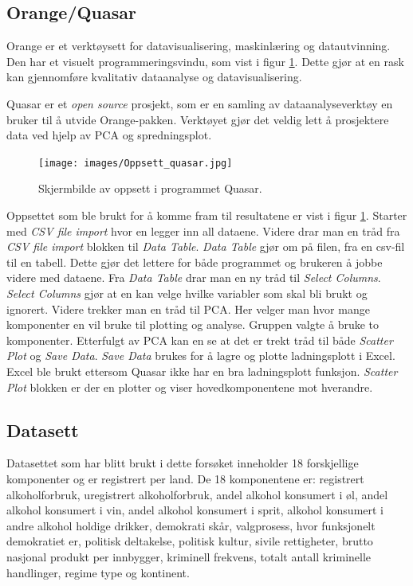 \documentclass[twocolumn, 11pt]{article} %
\begin{document}
\subsection{Orange/Quasar}
Orange er et verktøysett for datavisualisering, maskinlæring og datautvinning. Den har et visuelt programmeringsvindu, som vist i figur \ref{Oppsett_quasar}. Dette gjør at en rask kan gjennomføre kvalitativ dataanalyse og datavisualisering.\cite{Orange}

Quasar er et \textit{open source} prosjekt, som er en samling av dataanalyseverktøy en bruker til å utvide Orange-pakken\cite{Quasar}. Verktøyet gjør det veldig lett å prosjektere data ved hjelp av PCA og spredningsplot. 

\begin{figure}[ht]
\texttt{[image: images/Oppsett\_quasar.jpg]}
\caption{Skjermbilde av oppsett i programmet Quasar.}
\label{Oppsett_quasar}
\end{figure}

Oppsettet som ble brukt for å komme fram til resultatene er vist i figur \ref{Oppsett_quasar}. 
Starter med \textit{CSV file import} hvor en legger inn all dataene. Videre drar man en tråd fra \textit{CSV file import} blokken til \textit{Data Table}. \textit{Data Table} gjør om på filen, fra en csv-fil til en tabell. Dette gjør det lettere for både programmet og brukeren å jobbe videre med dataene. Fra \textit{Data Table} drar man en ny tråd til \textit{Select Columns}. \textit{Select Columns} gjør at en kan velge hvilke variabler som skal bli brukt og ignorert. Videre trekker man en tråd til PCA. Her velger man hvor mange komponenter en vil bruke til plotting og analyse. Gruppen valgte å bruke to komponenter. Etterfulgt av PCA kan en se at det er trekt tråd til både \textit{Scatter Plot} og \textit{Save Data}. \textit{Save Data} brukes for å lagre og plotte ladningsplott i Excel. Excel ble brukt ettersom Quasar ikke har en bra ladningsplott funksjon. \textit{Scatter Plot} blokken er der en plotter og viser hovedkomponentene mot hverandre. 

\subsection{Datasett}
Datasettet som har blitt brukt i dette forsøket inneholder 18 forskjellige komponenter og er registrert per land. De 18 komponentene er: registrert alkoholforbruk, uregistrert alkoholforbruk, andel alkohol konsumert i øl, andel alkohol konsumert i vin, andel alkohol konsumert i sprit, alkohol konsumert i andre alkohol holdige drikker, demokrati skår, valgprosess, hvor funksjonelt demokratiet er, politisk deltakelse, politisk kultur, sivile rettigheter, brutto nasjonal produkt per innbygger, kriminell frekvens, totalt antall kriminelle handlinger, regime type og kontinent.
\end{document}

